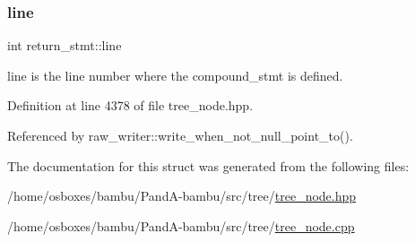 \subsubsection{\texorpdfstring{line}{line}}
{\footnotesize\ttfamily int return\+\_\+stmt\+::line}



line is the line number where the compound\+\_\+stmt is defined. 



Definition at line 4378 of file tree\+\_\+node.\+hpp.



Referenced by raw\+\_\+writer\+::write\+\_\+when\+\_\+not\+\_\+null\+\_\+point\+\_\+to().



The documentation for this struct was generated from the following files\+:\begin{DoxyCompactItemize}
\item 
/home/osboxes/bambu/\+Pand\+A-\/bambu/src/tree/\hyperlink{tree__node_8hpp}{tree\+\_\+node.\+hpp}\item 
/home/osboxes/bambu/\+Pand\+A-\/bambu/src/tree/\hyperlink{tree__node_8cpp}{tree\+\_\+node.\+cpp}\end{DoxyCompactItemize}
